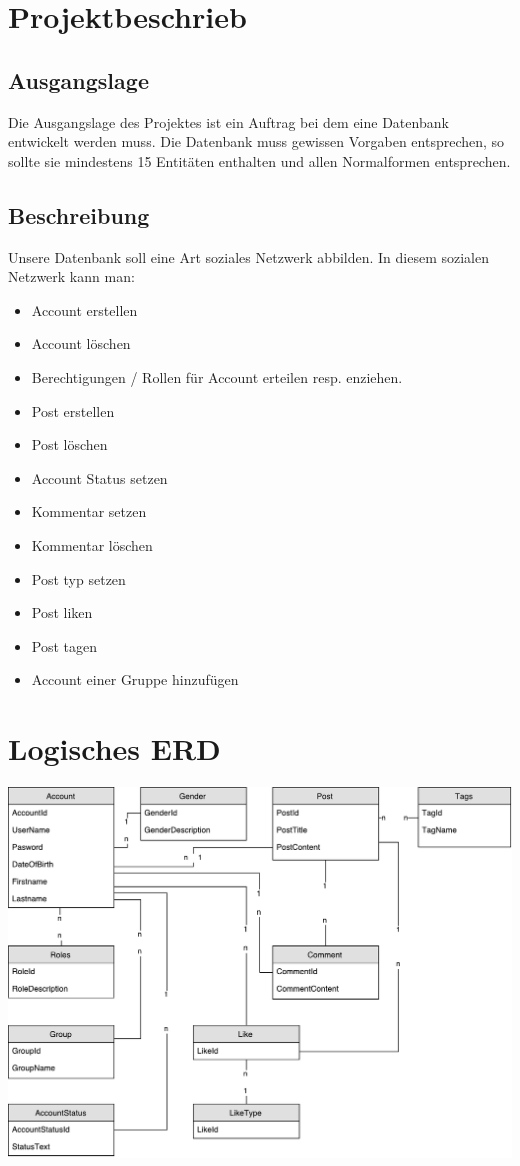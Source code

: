 \documentclass[12pt,twoside,a4paper]{article}
\title{\titleText}
\author{\authorText}
\date{\dateText}
\begin{document}
	\maketitle
	\tableofcontents
	\section {Projektbeschrieb}
	
	\subsection{Ausgangslage}
	
	Die Ausgangslage des Projektes ist ein Auftrag bei dem eine Datenbank entwickelt werden muss. Die Datenbank muss gewissen Vorgaben entsprechen, so sollte sie mindestens 15 Entitäten enthalten und allen Normalformen entsprechen.
	
	\subsection{Beschreibung}
	
	Unsere Datenbank soll eine Art soziales Netzwerk abbilden. In diesem sozialen Netzwerk kann man:
	\begin{itemize}
		\item Account erstellen
		\item Account löschen
		\item Berechtigungen / Rollen für Account erteilen resp. enziehen.
		\item Post erstellen
		\item Post löschen
		\item Account Status setzen
		\item Kommentar setzen
		\item Kommentar löschen
		\item Post typ setzen
		\item Post liken
		\item Post tagen
		\item Account einer Gruppe hinzufügen
		
	\end{itemize}
	
	\section{Logisches ERD}
	\includegraphics[width=15cm]{erd_a}
	
	
	
\end{document}
